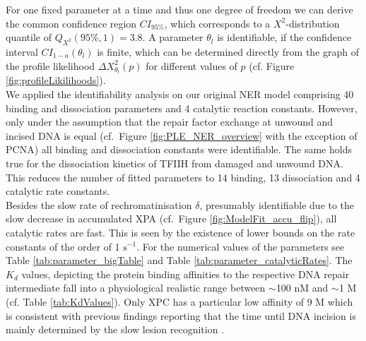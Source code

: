 For one fixed parameter at a time and thus one degree of freedom we can derive the common confidence region $CI_{95\%}$, which corresponds to a $X^2$-distribution quantile of $Q_{X^2}(95\%,1)=3.8$. A parameter $\theta_l$ is identifiable, if the confidence interval $CI_{1-a}(\theta_l)$ is finite, which can be determined directly from the graph of the profile likelihood $\Delta X_{\theta_l}^2(p)$ for different values of $p$ (cf. Figure \ref{fig:profileLikilihoods}).\\ 
We applied the identifiability analysis on our original NER model comprising 40 binding and dissociation parameters and 4 catalytic reaction constants. However, only under the assumption that the repair factor exchange at unwound and incised DNA is equal (cf.\ Figure \ref{fig:PLE_NER_overview} with the exception of PCNA) all binding and dissociation constants were identifiable. The same holds true for the dissociation kinetics of TFIIH from damaged and unwound DNA. This reduces the number of fitted parameters to 14 binding, 13 dissociation and 4 catalytic rate constants.\\ 
Besides the slow rate of rechromatinisation $\delta$, presumably identifiable due to the slow decrease in accumulated XPA (cf.\ Figure \ref{fig:ModelFit_accu_flip}), all catalytic rates are fast. This is seen by the existence of lower bounds on the rate constants of the order of 1 $\text{s}^{-1}$. For the numerical values of the parameters see Table \ref{tab:parameter_bigTable} and Table \ref{tab:parameter_catalyticRates}. The $K_d$ values, depicting the protein binding affinities to the respective DNA repair intermediate fall into a physiological realistic range between $\sim$100 nM and $\sim$1 \textmu M (cf. Table \ref{tab:KdValues}). Only XPC has a particular low affinity of 9 \textmu M which is consistent with previous findings reporting that the time until DNA incision is mainly determined by the slow lesion recognition \cite{Luijsterburg2010}.        

